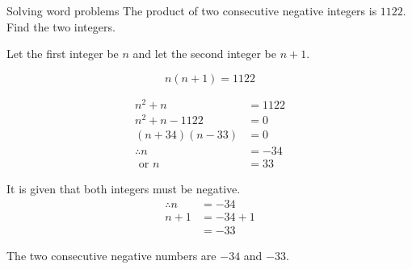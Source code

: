\begin{wex}
{Solving word problems}
{The product of two consecutive negative integers is $1122$. Find the two integers.}
{
Let the first integer be $n$ and let the second integer be $n+1$. 

\begin{equation*}
  n(n+1) = 1122
\end{equation*}

\begin{align*}
  n^{2} + n &= 1122 \\
  n^{2} + n - 1122 &= 0 \\
  (n+34)(n-33) &= 0 \\
  \therefore  n &= -34 \\
  \mbox{ or } n &= 33
\end{align*}

It is given that both integers must be negative.
\begin{align*}
  \therefore n &= -34 \\
  n + 1 &= -34 + 1 \\
  &= -33
\end{align*}

The two consecutive negative numbers are $-34$ and $-33$.
}
\end{wex}

